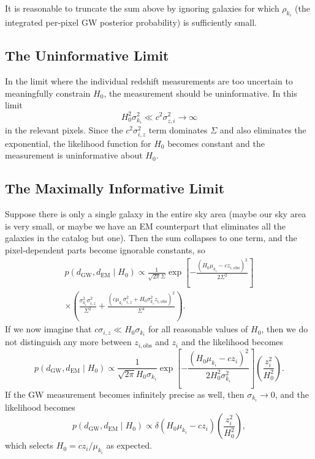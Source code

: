\documentclass[modern]{aastex62}
\newcommand{\dEM}{d_{\mathrm{EM}}}
\newcommand{\dGW}{d_{\mathrm{GW}}}
\begin{document}
It is reasonable to truncate the sum above by ignoring galaxies for which
$\rho_{k_i}$ (the integrated per-pixel \ac{GW} posterior probability) is
sufficiently small.

\subsection{The Uninformative Limit}

In the limit where the individual redshift measurements are too uncertain to
meaningfully constrain $H_0$, the measurement should be uninformative.  In this
limit
%
\begin{equation}
  H_0^2 \sigma_{k_i}^2 \ll c^2 \sigma_{z,i}^2 \to \infty
\end{equation}
%
in the relevant pixels.  Since the $c^2 \sigma_{i,z}^2$ term dominates $\Sigma$
and also eliminates the exponential, the likelihood function for $H_0$ becomes
constant and the measurement is uninformative about $H_0$.

\subsection{The Maximally Informative Limit}

Suppose there is only a single galaxy in the entire sky area (maybe our sky area
is very small, or maybe we have an \ac{EM} counterpart that eliminates all the
galaxies in the catalog but one).  Then the sum collapses to one term, and the
pixel-dependent parts become ignorable constants, so
%
\begin{multline}
  p\left( \dGW, \dEM \mid H_0 \right) \propto \frac{1}{\sqrt{2\pi} \Sigma} \exp\left[ -\frac{\left(H_0 \mu_{k_i} - c z_{i,\mathrm{obs}}\right)^2}{2 \Sigma^2} \right] \\ \times \left( \frac{\sigma_{k_i}^2 \sigma_{i,z}^2}{\Sigma^2} + \frac{\left( c \mu_{k_i} \sigma_{i,z}^2 + H_0 \sigma_{k_i}^2 z_{i,\mathrm{obs}} \right)^2}{\Sigma^4} \right).
\end{multline}
%
If we now imagine that $c \sigma_{i,z} \ll H_0 \sigma_{k_i}$ for all reasonable
values of $H_0$, then we do not distinguish any more between
$z_{i,\mathrm{obs}}$ and $z_i$ and the likelihood becomes
%
\begin{equation}
  p\left( \dGW, \dEM \mid H_0 \right) \propto \frac{1}{\sqrt{2\pi} H_0 \sigma_{k_i}} \exp\left[ -\frac{\left(H_0 \mu_{k_i} - c z_{i}\right)^2}{2 H_0^2 \sigma_{k_i}^2} \right] \left( \frac{z_{i}^2}{H_0^2} \right).
\end{equation}
%
If the \ac{GW} measurement becomes infinitely precise as well, then
$\sigma_{k_i} \to 0$, and the likelihood becomes
%
\begin{equation}
  p\left( \dGW, \dEM \mid H_0 \right) \propto \delta \left( H_0 \mu_{k_i} - c z_{i}\right) \left( \frac{z_{i}^2}{H_0^2} \right),
\end{equation}
%
which selects $H_0 = c z_i / \mu_{k_i}$ as expected.


\end{document}
